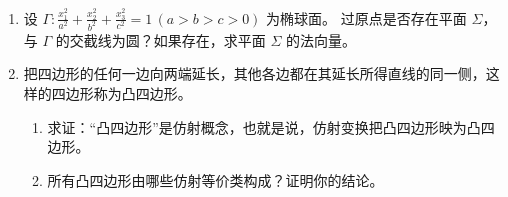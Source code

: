 \begin{enumerate}
    \item 设 $\Gamma: \frac{x_{1}^{2}}{a^{2}}+\frac{x_{2}^{2}}{b^{2}}+\frac{x_{3}^{2}}{c^{2}}=1 \, (a>b>c>0)$ 为椭球面。
    过原点是否存在平面 $\Sigma$，与 $\Gamma$ 的交截线为圆？如果存在，求平面 $\Sigma$ 的法向量。

    \item 把四边形的任何一边向两端延长，其他各边都在其延长所得直线的同一侧，这样的四边形称为凸四边形。
    \begin{enumerate}
        \item[(a)] 求证：``凸四边形''是仿射概念，也就是说，仿射变换把凸四边形映为凸四边形。
        \item[(b)] 所有凸四边形由哪些仿射等价类构成？证明你的结论。
    \end{enumerate}
    \end{enumerate}


